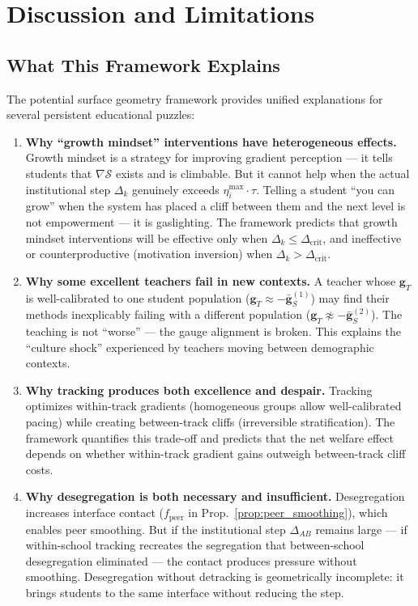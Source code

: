 \documentclass[11pt,a4paper]{article}
\newcommand{\gradS}{\nabla\mathcal{S}}
\begin{document}
\section{Discussion and Limitations}
\label{sec:discussion}
\subsection{What This Framework Explains}
The potential surface geometry framework provides unified explanations for several persistent educational puzzles:
\begin{enumerate}[label=(\arabic*)]
    \item \textbf{Why ``growth mindset'' interventions have heterogeneous effects.} Growth mindset is a strategy for improving gradient perception — it tells students that $\gradS$ exists and is climbable. But it cannot help when the actual institutional step $\Delta_k$ genuinely exceeds $\eta_i^{\max} \cdot \tau$. Telling a student ``you can grow'' when the system has placed a cliff between them and the next level is not empowerment — it is gaslighting. The framework predicts that growth mindset interventions will be effective only when $\Delta_k \leq \Delta_{\text{crit}}$, and ineffective or counterproductive (motivation inversion) when $\Delta_k > \Delta_{\text{crit}}$.
    \item \textbf{Why some excellent teachers fail in new contexts.} A teacher whose $\mathbf{g}_T$ is well-calibrated to one student population ($\mathbf{g}_T \approx -\bar{\mathbf{g}}_S^{(1)}$) may find their methods inexplicably failing with a different population ($\mathbf{g}_T \not\approx -\bar{\mathbf{g}}_S^{(2)}$). The teaching is not ``worse'' — the gauge alignment is broken. This explains the ``culture shock'' experienced by teachers moving between demographic contexts.
    \item \textbf{Why tracking produces both excellence and despair.} Tracking optimizes within-track gradients (homogeneous groups allow well-calibrated pacing) while creating between-track cliffs (irreversible stratification). The framework quantifies this trade-off and predicts that the net welfare effect depends on whether within-track gradient gains outweigh between-track cliff costs.
    \item \textbf{Why desegregation is both necessary and insufficient.} Desegregation increases interface contact ($f_{\text{peer}}$ in Prop.~\ref{prop:peer_smoothing}), which enables peer smoothing. But if the institutional step $\Delta_{AB}$ remains large — if within-school tracking recreates the segregation that between-school desegregation eliminated — the contact produces pressure without smoothing. Desegregation without detracking is geometrically incomplete: it brings students to the same interface without reducing the step.
\end{enumerate}
\end{document}
